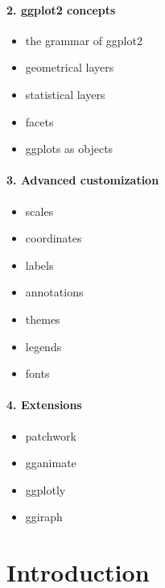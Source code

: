 \documentclass[
]{book}
\providecommand{\tightlist}{%
  \setlength{\itemsep}{0pt}\setlength{\parskip}{0pt}}
\begin{document}
\hypertarget{ggplot2-concepts}{%
\paragraph*{2. ggplot2 concepts}\label{ggplot2-concepts}}

\begin{itemize}
\tightlist
\item
  the grammar of ggplot2
\item
  geometrical layers
\item
  statistical layers
\item
  facets
\item
  ggplots as objects
\end{itemize}

\hypertarget{advanced-customization}{%
\paragraph*{3. Advanced customization}\label{advanced-customization}}

\begin{itemize}
\tightlist
\item
  scales
\item
  coordinates
\item
  labels
\item
  annotations
\item
  themes
\item
  legends
\item
  fonts
\end{itemize}

\hypertarget{extensions}{%
\paragraph*{4. Extensions}\label{extensions}}

\begin{itemize}
\tightlist
\item
  patchwork
\item
  gganimate
\item
  ggplotly
\item
  ggiraph
\end{itemize}

\hypertarget{introduction}{%
\section{Introduction}\label{introduction}}
\end{document}
